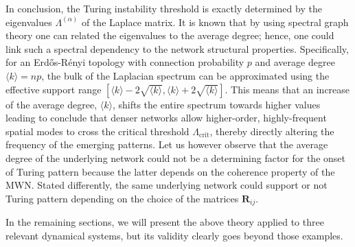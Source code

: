 \documentclass[aps,showpacs,preprintnumbers,amsmath,amssymb,twocolumn,superscriptaddress,floatfix,nofootinbib,10pt,pre]{revtex4-1}
\begin{document}
{\color{black}
In conclusion, the Turing instability threshold is exactly determined by the eigenvalues $\Lambda^{(\alpha)}$ of the Laplace matrix. It is known that by using spectral graph theory one can related the eigenvalues to the average degree; hence, one could link such a spectral dependency to the network structural properties. Specifically, for an Erd\H{o}s-R\'{e}nyi topology with connection probability $p$ and average degree $\langle k\rangle=np$, the bulk of the Laplacian spectrum can be approximated using the effective support range $[\langle k\rangle-2\sqrt{\langle k\rangle},\langle k\rangle+2\sqrt{\langle k\rangle}]$. This means that an increase of the average degree, $\langle k \rangle$, shifts the entire spectrum towards higher values leading to conclude that denser networks allow higher-order, highly-frequent spatial modes to cross the critical threshold $\Lambda_{\text{crit}}$, thereby directly altering the frequency of the emerging patterns. Let us however observe that the average degree of the underlying network could not be a determining factor for the onset of Turing pattern because the latter depends on the coherence property of the MWN. Stated differently, the same underlying network could support or not Turing pattern depending on the choice of the matrices $\mathbf{R}_{ij}$.}

In the remaining sections, we will present the above theory applied to three relevant dynamical systems, but its validity clearly goes beyond those examples.
\end{document}
